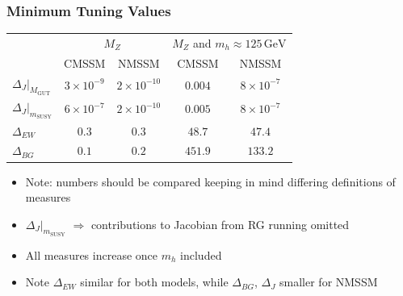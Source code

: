 \documentclass[10pt,aspectratio=169]{beamer}
\newcommand{\mgut}{\ensuremath{M_{\text{GUT}}}\xspace}
\newcommand{\msusy}{\ensuremath{m_{\text{SUSY}}}\xspace}
\newcommand{\mz}{\ensuremath{M_Z}\xspace}
\newcommand{\mh}{\ensuremath{m_h}\xspace}
\newcommand{\gev}{\ensuremath{\,\text{GeV}}\xspace}
\begin{document}
\begin{frame}
  \frametitle{Minimum Tuning Values}
  \begin{table}[htbp]
    \centering
    \begin{tabular}{lcccc}
      \toprule
      & \multicolumn{2}{c}{\mz}
      & \multicolumn{2}{c}{\mz and $\mh \approx 125\gev$} \\
      \cmidrule(r){2-3}\cmidrule(r){4-5}
      & CMSSM & NMSSM & CMSSM & NMSSM\\
      \midrule
      $\Delta_J\big|_{\mgut}$ & $3 \times 10^{-9}$
      & $2 \times 10^{-10}$ & $0.004$ & $8 \times 10^{-7}$ \\
      $\Delta_J\big|_{\msusy}$ & $6 \times 10^{-7}$
      & $2 \times 10^{-10}$ & $0.005$ & $8 \times 10^{-7}$ \\
      $\Delta_{EW}$ & $0.3$ & $0.3$ & $48.7$ & $47.4$ \\
      $\Delta_{BG}$ & $0.1$ & $0.2$ & $451.9$ & $133.2$ \\
      \bottomrule
    \end{tabular}
  \end{table}
  \begin{itemize} \itemsep1em
  \item \alert{Note: numbers should be compared keeping in mind differing
    definitions of measures}
  \item $\Delta_J \big|_{\msusy}$ $\Rightarrow$ contributions to Jacobian
    from RG running omitted
  \item All measures increase once $m_h$ included
  \item Note $\Delta_{EW}$ similar for both models, while $\Delta_{BG}$,
    $\Delta_J$ smaller for NMSSM
  \end{itemize}
\end{frame}
\end{document}
